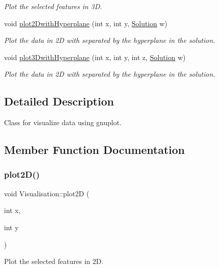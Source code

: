 \begin{DoxyCompactItemize}
\begin{DoxyCompactList}\small\item\em Plot the selected features in 3D. \end{DoxyCompactList}\item 
void \hyperlink{class_visualisation_a39b7bd29878bfc2d21fc4219803fd99d}{plot2\+Dwith\+Hyperplane} (int x, int y, \hyperlink{class_solution}{Solution} w)
\begin{DoxyCompactList}\small\item\em Plot the data in 2D with separated by the hyperplane in the solution. \end{DoxyCompactList}\item 
void \hyperlink{class_visualisation_a3318af0b08322183e0dbe8d4891b580d}{plot3\+Dwith\+Hyperplane} (int x, int y, int z, \hyperlink{class_solution}{Solution} w)
\begin{DoxyCompactList}\small\item\em Plot the data in 2D with separated by the hyperplane in the solution. \end{DoxyCompactList}\end{DoxyCompactItemize}


\subsection{Detailed Description}
Class for visualize data using gnuplot. 

\subsection{Member Function Documentation}
\mbox{\label{class_visualisation_a7569c77520391e6adf7e285410f4b358}} 
\subsubsection{\texorpdfstring{plot2\+D()}{plot2D()}}
{\footnotesize\ttfamily void Visualisation\+::plot2D (\begin{DoxyParamCaption}\item[{int}]{x,  }\item[{int}]{y }\end{DoxyParamCaption})}



Plot the selected features in 2D. 


